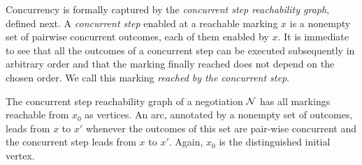 Concurrency is formally captured by the \textit{concurrent step reachability graph}, defined next. A \textit{concurrent step} enabled at a reachable marking $x$ is a nonempty set of pairwise concurrent outcomes, each of them enabled by $x$. It is immediate to see that all the outcomes of a concurrent step can be executed subsequently in arbitrary order and that the marking finally reached does not depend on the chosen order. We call this marking \textit{reached by the concurrent step}.

\begin{definition}
The \textsf{concurrent step reachability graph} of a negotiation $\mathcal{N}$ has all markings reachable from $x_0$ as vertices. An arc, annotated by a nonempty set of outcomes, leads from $x$ to $x'$ whenever the outcomes of this set are pair-wise concurrent and the concurrent step leads from $x$ to $x'$. Again, $x_0$ is the distinguished initial vertex.
\end{definition}



